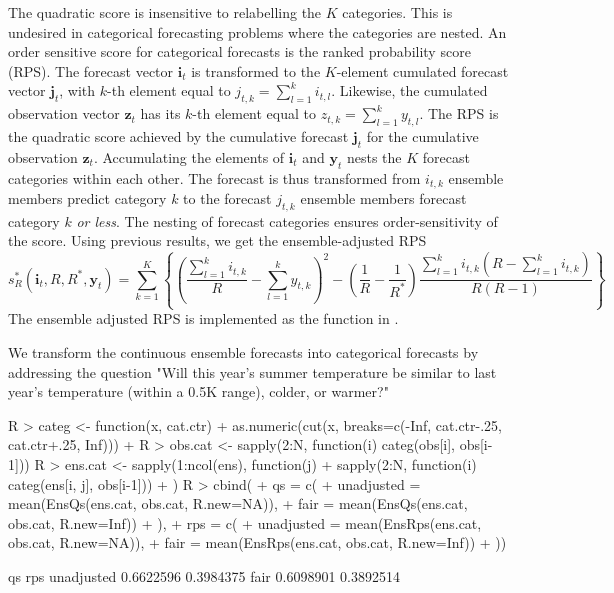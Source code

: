\documentclass[article]{jss}
\begin{document}
The quadratic score is insensitive to relabelling the $K$ categories.
This is undesired in categorical forecasting problems where the categories are nested.
An order sensitive score for categorical forecasts is the ranked probability score (RPS).
The forecast vector $\mathbf{i}_t$ is transformed to the $K$-element cumulated forecast vector $\mathbf{j}_t$, with $k$-th element equal to $j_{t,k} = \sum_{l=1}^k i_{t,l}$.
Likewise, the cumulated observation vector $\mathbf{z}_t$ has its $k$-th element equal to $z_{t,k} = \sum_{l=1}^k y_{t,l}$.
The RPS is the quadratic score achieved by the cumulative forecast $\mathbf{j}_t$ for the cumulative observation $\mathbf{z}_t$.
Accumulating the elements of $\mathbf{i}_t$ and $\mathbf{y}_t$ nests the $K$ forecast categories within each other. 
The forecast is thus transformed from $i_{t,k}$ ensemble members predict category $k$ to the forecast $j_{t,k}$ ensemble members forecast category $k$ \emph{or less}.
The nesting of forecast categories ensures order-sensitivity of the score.
Using previous results, we get the ensemble-adjusted RPS
%
\begin{equation}
s_{R}^*(\mathbf{i}_t, R, R^*, \mathbf{y}_t) = \sum_{k=1}^K \left\{ \left(\frac{\sum_{l=1}^k i_{t,k}}{R} - \sum_{l=1}^k y_{t,k}\right)^2 - \left(\frac{1}{R} - \frac{1}{R^*}\right) \frac{\sum_{l=1}^k i_{t,k}(R-\sum_{l=1}^k i_{t,k})}{R(R-1)}\right\}
\end{equation}
%
The ensemble adjusted RPS is implemented as the function  in .



We transform the continuous ensemble forecasts into categorical forecasts by addressing the question "Will this year's summer temperature be similar to last year's temperature (within a 0.5K range), colder, or warmer?"

\begin{Schunk}
\begin{Sinput}
R > categ <- function(x, cat.ctr) {
+   as.numeric(cut(x, breaks=c(-Inf, cat.ctr-.25, cat.ctr+.25, Inf)))
+ }
R > obs.cat <- sapply(2:N, function(i) categ(obs[i], obs[i-1]))
R > ens.cat <- sapply(1:ncol(ens), function(j) {
+                   sapply(2:N, function(i) categ(ens[i, j], obs[i-1]))
+            })
R > cbind(
+ qs = c(
+   unadjusted = mean(EnsQs(ens.cat, obs.cat, R.new=NA)), 
+   fair       = mean(EnsQs(ens.cat, obs.cat, R.new=Inf))
+ ),
+ rps = c(
+   unadjusted = mean(EnsRps(ens.cat, obs.cat, R.new=NA)), 
+   fair       = mean(EnsRps(ens.cat, obs.cat, R.new=Inf))
+ ))
\end{Sinput}
\begin{Soutput}
                  qs       rps
unadjusted 0.6622596 0.3984375
fair       0.6098901 0.3892514
\end{Soutput}
\end{Schunk}
\end{document}
